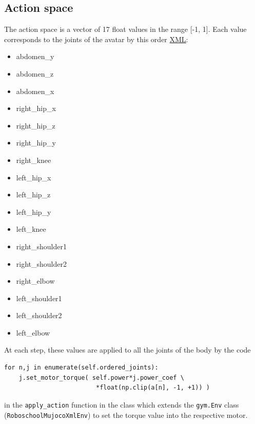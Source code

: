 \documentclass{article}
\begin{document}
  \subsection{Action space}
  The action space is a vector of 17 float values in the range [-1, 1]. Each
  value corresponds to the joints of the avatar by this order
  \href{https://github.com/openai/roboschool/blob/master/roboschool/mujoco_assets/humanoid_symmetric.xml}{XML}:
  \begin{multicols}{2}
  \begin{itemize}
  \item{abdomen\_y}
  \item{abdomen\_z}
  \item{abdomen\_x}
  \item{right\_hip\_x}
  \item{right\_hip\_z}
  \item{right\_hip\_y}
  \item{right\_knee}
  \item{left\_hip\_x}
  \item{left\_hip\_z}
  \item{left\_hip\_y}
  \item{left\_knee}
  \item{right\_shoulder1}
  \item{right\_shoulder2}
  \item{right\_elbow}
  \item{left\_shoulder1}
  \item{left\_shoulder2}
  \item{left\_elbow}
  \end{itemize}
\end{multicols}
  At each step, these values are applied to all the joints of the body by the code
\begin{verbatim}
for n,j in enumerate(self.ordered_joints):
    j.set_motor_torque( self.power*j.power_coef \
                         *float(np.clip(a[n], -1, +1)) )
\end{verbatim}

in the \verb?apply_action? function in the class which extends the
\verb?gym.Env? class (\verb?RoboschoolMujocoXmlEnv?) to set the torque value
into the respective motor.
\end{document}
